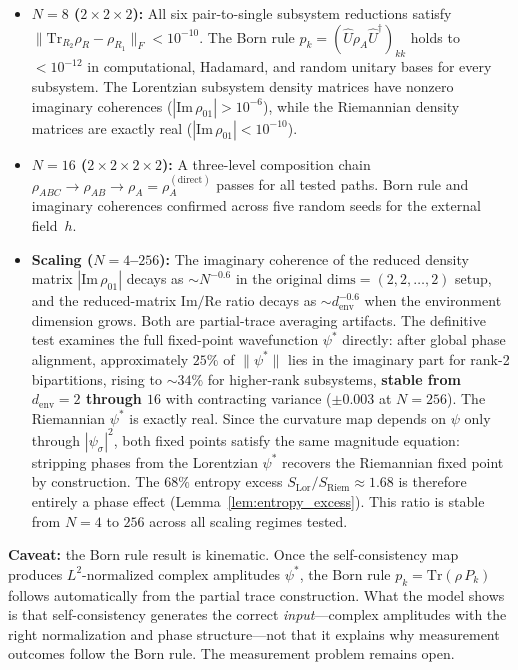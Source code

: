 \documentclass[12pt,a4paper]{article}
\theoremstyle{definition}
\theoremstyle{remark}
\begin{document}
\begin{itemize}
\item \textbf{$N = 8$ ($2 \times 2 \times 2$):} All six pair-to-single
subsystem reductions satisfy $\|\mathrm{Tr}_{R_2}\rho_R -
\rho_{R_1}\|_F < 10^{-10}$. The Born rule
$p_k = (\hat{U}\rho_A\hat{U}^\dagger)_{kk}$ holds to $< 10^{-12}$
in computational, Hadamard, and random unitary bases for every
subsystem. The Lorentzian subsystem density matrices have nonzero
imaginary coherences ($|\mathrm{Im}\,\rho_{01}| > 10^{-6}$), while the
Riemannian density matrices are exactly real ($|\mathrm{Im}\,\rho_{01}|
< 10^{-10}$).
\item \textbf{$N = 16$ ($2 \times 2 \times 2 \times 2$):} A
three-level composition chain
$\rho_{ABC} \to \rho_{AB} \to \rho_A = \rho_A^{(\mathrm{direct})}$
passes for all tested paths. Born rule and imaginary coherences
confirmed across five random seeds for the external field~$h$.
\item \textbf{Scaling ($N = 4$--$256$):} The imaginary coherence of
the reduced density matrix $|\mathrm{Im}\,\rho_{01}|$ decays as $\sim
N^{-0.6}$ in the original $\mathrm{dims} = (2,2,\ldots,2)$ setup, and
the reduced-matrix $\mathrm{Im/Re}$ ratio decays as $\sim
d_{\mathrm{env}}^{-0.6}$ when the environment dimension grows. Both are
partial-trace averaging artifacts. The definitive test examines the full
fixed-point wavefunction $\psi^*$ directly: after global phase
alignment, approximately $25\%$ of $\|\psi^*\|$ lies in the imaginary
part for rank-2 bipartitions, rising to $\sim 34\%$ for higher-rank
subsystems, \textbf{stable from $d_{\mathrm{env}} = 2$ through $16$}
with contracting variance ($\pm 0.003$ at $N = 256$). The Riemannian
$\psi^*$ is exactly real. Since the curvature map depends on $\psi$
only through $|\psi_\sigma|^2$, both fixed points satisfy the same
magnitude equation: stripping phases from the Lorentzian $\psi^*$
recovers the Riemannian fixed point by construction. The $68\%$
entropy excess $S_{\mathrm{Lor}} / S_{\mathrm{Riem}} \approx 1.68$
is therefore entirely a phase effect
(Lemma~\ref{lem:entropy_excess}). This ratio is stable from
$N = 4$ to $256$ across all scaling regimes tested.
\end{itemize}
\textbf{Caveat:} the Born rule result is kinematic. Once the
self-consistency map produces $L^2$-normalized complex amplitudes
$\psi^*$, the Born rule $p_k = \mathrm{Tr}(\rho\, P_k)$ follows
automatically from the partial trace construction. What the model shows
is that self-consistency generates the correct \emph{input}---complex
amplitudes with the right normalization and phase structure---not that it
explains why measurement outcomes follow the Born rule. The measurement
problem remains open.
\end{document}
